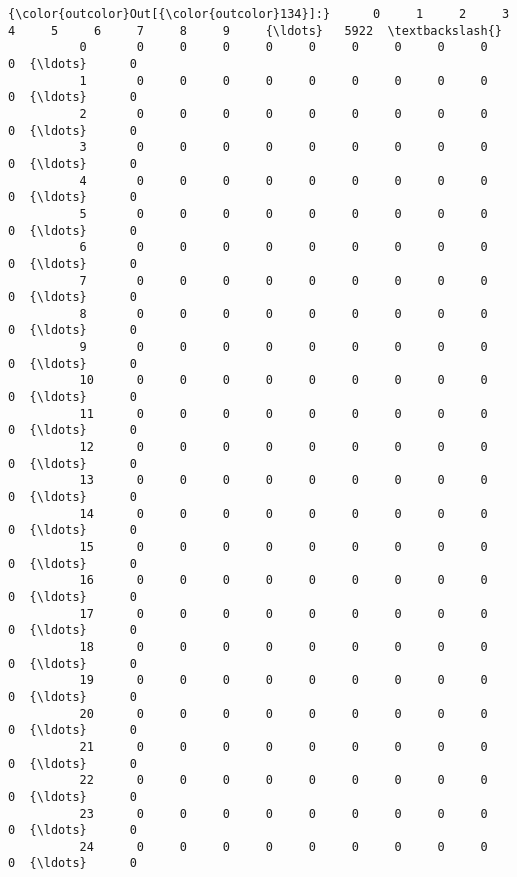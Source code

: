 \documentclass[11pt]{article}
\begin{document}
\begin{Verbatim}[commandchars=\\\{\}]
{\color{outcolor}Out[{\color{outcolor}134}]:}      0     1     2     3     4     5     6     7     8     9     {\ldots}   5922  \textbackslash{}
          0       0     0     0     0     0     0     0     0     0     0  {\ldots}      0   
          1       0     0     0     0     0     0     0     0     0     0  {\ldots}      0   
          2       0     0     0     0     0     0     0     0     0     0  {\ldots}      0   
          3       0     0     0     0     0     0     0     0     0     0  {\ldots}      0   
          4       0     0     0     0     0     0     0     0     0     0  {\ldots}      0   
          5       0     0     0     0     0     0     0     0     0     0  {\ldots}      0   
          6       0     0     0     0     0     0     0     0     0     0  {\ldots}      0   
          7       0     0     0     0     0     0     0     0     0     0  {\ldots}      0   
          8       0     0     0     0     0     0     0     0     0     0  {\ldots}      0   
          9       0     0     0     0     0     0     0     0     0     0  {\ldots}      0   
          10      0     0     0     0     0     0     0     0     0     0  {\ldots}      0   
          11      0     0     0     0     0     0     0     0     0     0  {\ldots}      0   
          12      0     0     0     0     0     0     0     0     0     0  {\ldots}      0   
          13      0     0     0     0     0     0     0     0     0     0  {\ldots}      0   
          14      0     0     0     0     0     0     0     0     0     0  {\ldots}      0   
          15      0     0     0     0     0     0     0     0     0     0  {\ldots}      0   
          16      0     0     0     0     0     0     0     0     0     0  {\ldots}      0   
          17      0     0     0     0     0     0     0     0     0     0  {\ldots}      0   
          18      0     0     0     0     0     0     0     0     0     0  {\ldots}      0   
          19      0     0     0     0     0     0     0     0     0     0  {\ldots}      0   
          20      0     0     0     0     0     0     0     0     0     0  {\ldots}      0   
          21      0     0     0     0     0     0     0     0     0     0  {\ldots}      0   
          22      0     0     0     0     0     0     0     0     0     0  {\ldots}      0   
          23      0     0     0     0     0     0     0     0     0     0  {\ldots}      0   
          24      0     0     0     0     0     0     0     0     0     0  {\ldots}      0   

\end{Verbatim}
\end{document}
